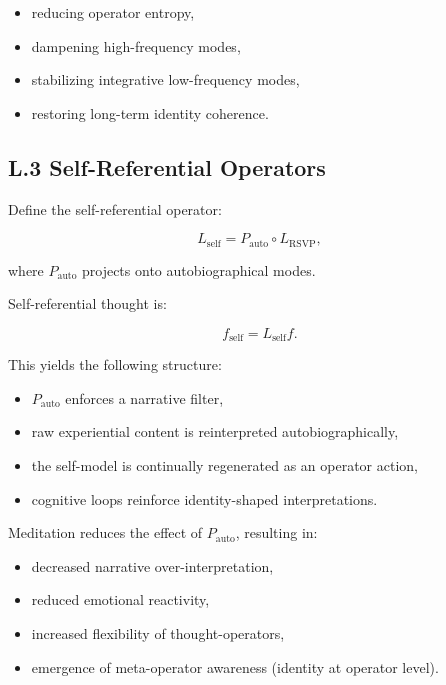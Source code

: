 \documentclass[12pt]{article}
\begin{document}
\begin{itemize}
    \item reducing operator entropy,
    \item dampening high-frequency modes,
    \item stabilizing integrative low-frequency modes,
    \item restoring long-term identity coherence.
\end{itemize}

\subsection*{L.3 Self-Referential Operators}

Define the self-referential operator:

\[
L_{\text{self}} = P_{\text{auto}} \circ L_{\text{RSVP}},
\]

where $P_{\text{auto}}$ projects onto autobiographical modes.

Self-referential thought is:

\[
f_{\text{self}} = L_{\text{self}} f.
\]

This yields the following structure:

\begin{itemize}
    \item $P_{\text{auto}}$ enforces a narrative filter,
    \item raw experiential content is reinterpreted autobiographically,
    \item the self-model is continually regenerated as an operator action,
    \item cognitive loops reinforce identity-shaped interpretations.
\end{itemize}

Meditation reduces the effect of $P_{\text{auto}}$, resulting in:

\begin{itemize}
    \item decreased narrative over-interpretation,
    \item reduced emotional reactivity,
    \item increased flexibility of thought-operators,
    \item emergence of meta-operator awareness (identity at operator level).
\end{itemize}

\end{document}
